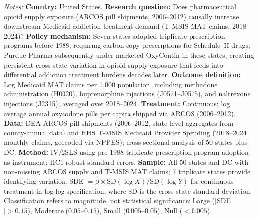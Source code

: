 \begin{table}[t]
\begin{threeparttable}
\noindent\parbox{\textwidth}{\scriptsize \textit{Notes:} \textbf{Country:} United States. \textbf{Research question:} Does pharmaceutical opioid supply exposure (ARCOS pill shipments, 2006--2012) causally increase downstream Medicaid addiction treatment demand (T-MSIS MAT claims, 2018--2024)? \textbf{Policy mechanism:} Seven states adopted triplicate prescription programs before 1988, requiring carbon-copy prescriptions for Schedule~II drugs; Purdue Pharma subsequently under-marketed OxyContin in these states, creating persistent cross-state variation in opioid supply exposure that feeds into differential addiction treatment burdens decades later. \textbf{Outcome definition:} Log Medicaid MAT claims per 1,000 population, including methadone administration (H0020), buprenorphine injections (J0571--J0575), and naltrexone injections (J2315), averaged over 2018--2024. \textbf{Treatment:} Continuous; log average annual oxycodone pills per capita shipped via ARCOS (2006--2012). \textbf{Data:} DEA ARCOS pill shipments (2006--2012, state-level aggregates from county-annual data) and HHS T-MSIS Medicaid Provider Spending (2018--2024 monthly claims, geocoded via NPPES); cross-sectional analysis of 50 states plus DC. \textbf{Method:} IV/2SLS using pre-1988 triplicate prescription program adoption as instrument; HC1 robust standard errors. \textbf{Sample:} All 50 states and DC with non-missing ARCOS supply and T-MSIS MAT claims; 7 triplicate states provide identifying variation. SDE $= \hat{\beta} \times \text{SD}(\log X) / \text{SD}(\log Y)$ for continuous treatment in log-log specification, where SD is the cross-state standard deviation. Classification refers to magnitude, not statistical significance: Large ($|$SDE$| > 0.15$), Moderate ($0.05$--$0.15$), Small ($0.005$--$0.05$), Null ($< 0.005$).
}
\end{threeparttable}
\end{table}
